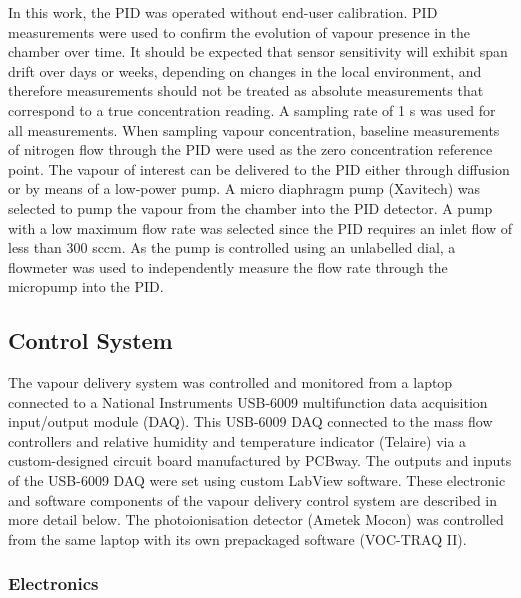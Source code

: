 \documentclass[
  a4paper,
]{scrbook}
\begin{document}
In this work, the PID was operated without end-user calibration. PID
measurements were used to confirm the evolution of vapour presence in
the chamber over time. It should be expected that sensor sensitivity
will exhibit span drift over days or weeks, depending on changes in the
local environment, and therefore measurements should not be treated as
absolute measurements that correspond to a true concentration reading. A
sampling rate of 1 s was used for all measurements. When sampling vapour
concentration, baseline measurements of nitrogen flow through the PID
were used as the zero concentration reference point. The vapour of
interest can be delivered to the PID either through diffusion or by
means of a low-power pump. A micro diaphragm pump (Xavitech) was
selected to pump the vapour from the chamber into the PID detector. A
pump with a low maximum flow rate was selected since the PID requires an
inlet flow of less than 300 sccm. As the pump is controlled using an
unlabelled dial, a flowmeter was used to independently measure the flow
rate through the micropump into the PID.

\hypertarget{sec-control-system}{%
\subsection{Control System}\label{sec-control-system}}

The vapour delivery system was controlled and monitored from a laptop
connected to a National Instruments USB-6009 multifunction data
acquisition input/output module (DAQ). This USB-6009 DAQ connected to
the mass flow controllers and relative humidity and temperature
indicator (Telaire) via a custom-designed circuit board manufactured by
PCBway. The outputs and inputs of the USB-6009 DAQ were set using custom
LabView software. These electronic and software components of the vapour
delivery control system are described in more detail below. The
photoionisation detector (Ametek Mocon) was controlled from the same
laptop with its own prepackaged software (VOC-TRAQ II).

\hypertarget{electronics}{%
\subsubsection*{Electronics}\label{electronics}}
\end{document}
